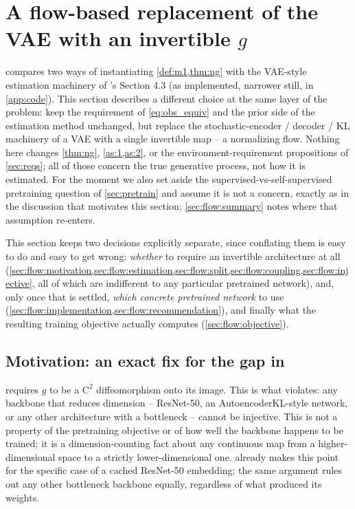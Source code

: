 \section{A flow-based replacement of the VAE with an invertible \texorpdfstring{$g$}{g}}
\label{sec:flow}

 compares two ways of instantiating \cref{def:m1,thm:ng} with the VAE-style estimation
machinery of \cite{ng2025}'s Section 4.3 (as implemented, narrower still, in \cref{app:code}). This
section describes a different choice at the same layer of the problem: keep the requirement of
\cref{eq:obs_equiv} and the prior side of the estimation method unchanged, but replace the
stochastic-encoder / decoder / KL machinery of a VAE with a single invertible map -- a normalizing flow.
Nothing here changes \cref{thm:ng}, \cref{as:1,as:2}, or the environment-requirement propositions of
\cref{sec:reqs}; all of those concern the true generative process, not how it is estimated. For the
moment we also set aside the supervised-vs-self-supervised pretraining question of \cref{sec:pretrain}
and assume it is not a concern, exactly as in the discussion that motivates this section;
\cref{sec:flow:summary} notes where that assumption re-enters.

This section keeps two decisions explicitly separate, since conflating them is easy to do and easy to
get wrong: \emph{whether} to require an invertible architecture at all (\cref{sec:flow:motivation,sec:flow:estimation,sec:flow:split,sec:flow:coupling,sec:flow:injective}, all of which are indifferent to
any particular pretrained network), and, only once that is settled, \emph{which concrete pretrained
network} to use (\cref{sec:flow:implementation,sec:flow:recommendation}), and finally what the resulting
training objective actually computes (\cref{sec:flow:objective}).

\subsection{Motivation: an exact fix for the gap in \texorpdfstring{}{Option B}}
\label{sec:flow:motivation}
 requires $g$ to be a $\mathrm{C}^2$ diffeomorphism onto its image. This is what
 violates: any backbone that reduces dimension -- ResNet-50, an
AutoencoderKL-style network, or any other architecture with a bottleneck -- cannot be injective. This is
not a property of the pretraining objective or of how well the backbone happens to be trained; it is a
dimension-counting fact about any continuous map from a higher-dimensional space to a strictly
lower-dimensional one.  already makes this point for the specific case of a cached
ResNet-50 embedding; the same argument rules out any other bottleneck backbone equally, regardless of
what produced its weights.

